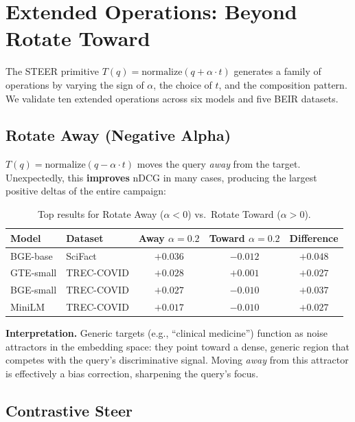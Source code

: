 \documentclass{article}
\begin{document}
\section{Extended Operations: Beyond Rotate Toward}
\label{sec:extended}

The STEER primitive $T(q) = \text{normalize}(q + \alpha \cdot t)$ generates a family of operations by varying the sign of $\alpha$, the choice of $t$, and the composition pattern. We validate ten extended operations across six models and five BEIR datasets.

\subsection{Rotate Away (Negative Alpha)}

$T(q) = \text{normalize}(q - \alpha \cdot t)$ moves the query \emph{away} from the target. Unexpectedly, this \textbf{improves} nDCG in many cases, producing the largest positive deltas of the entire campaign:

\begin{table}[h]
\centering
\caption{Top results for Rotate Away ($\alpha < 0$) vs.\ Rotate Toward ($\alpha > 0$).}
\begin{tabular}{llccc}
\toprule
Model & Dataset & Away $\alpha{=}0.2$ & Toward $\alpha{=}0.2$ & Difference \\
\midrule
BGE-base & SciFact & $\mathbf{+0.036}$ & $-0.012$ & $+0.048$ \\
GTE-small & TREC-COVID & $\mathbf{+0.028}$ & $+0.001$ & $+0.027$ \\
BGE-small & TREC-COVID & $\mathbf{+0.027}$ & $-0.010$ & $+0.037$ \\
MiniLM & TREC-COVID & $+0.017$ & $-0.010$ & $+0.027$ \\
\bottomrule
\end{tabular}
\end{table}

\noindent\textbf{Interpretation.} Generic targets (e.g., ``clinical medicine'') function as noise attractors in the embedding space: they point toward a dense, generic region that competes with the query's discriminative signal. Moving \emph{away} from this attractor is effectively a bias correction, sharpening the query's focus.

\subsection{Contrastive Steer}
\end{document}
